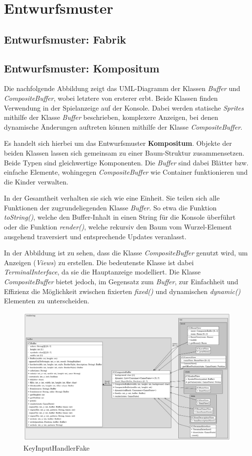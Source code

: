 \chapter{Entwurfsmuster}

\section{Entwurfsmuster: Fabrik}

\section{Entwurfsmuster: Kompositum}

Die nachfolgende Abbildung zeigt das UML-Diagramm der Klassen
\textit{Buffer} und \textit{CompositeBuffer}, wobei letztere von
ersterer erbt. Beide Klassen finden Verwendung in der Spielanzeige
auf der Konsole. Dabei werden statische \textit{Sprites} mithilfe
der Klasse \textit{Buffer} beschrieben, komplexere Anzeigen, bei denen
dynamische Änderungen auftreten können mithilfe der Klasse
\textit{CompositeBuffer}.

Es handelt sich hierbei um das Entwurfsmuster \textbf{Kompositum}. 
Objekte der beiden Klassen lassen sich gemeinsam zu einer Baum-Struktur
zusammensetzen. Beide Typen sind gleichwertige Komponenten. Die
\textit{Buffer} sind dabei Blätter bzw. einfache Elemente, wohingegen
\textit{CompositeBuffer} wie Container funktionieren und die Kinder
verwalten. 

In der Gesamtheit verhalten sie sich wie eine Einheit. Sie teilen sich
alle Funktionen der zugrundeliegenden Klasse \textit{Buffer}. So etwa
die Funktion \textit{toString()}, welche den Buffer-Inhalt in einen
String für die Konsole überführt oder die Funktion \textit{render()},
welche rekursiv den Baum vom Wurzel-Element ausgehend traversiert und
entsprechende Updates veranlasst.

In der Abbildung ist zu sehen, dass die Klasse
\textit{CompositeBuffer} genutzt wird, um Anzeigen (\textit{Views})
zu erstellen. Die bedeutenste Klasse ist dabei
\textit{TerminalInterface}, da sie die Hauptanzeige modelliert.
Die Klasse \textit{CompositeBuffer} bietet jedoch, im Gegensatz zum
\textit{Buffer}, zur Einfachheit und Effizienz die Möglichkeit
zwischen fixierten \textit{fixed()} und dynamischen \textit{dynamic()}
Elementen zu unterscheiden.

\vspace{0.5cm}
\begin{figure}[H]
    \centering
    \includegraphics[width=1\linewidth]{Bilder/Visualisierung/CompositeBuffer_structure.png}
    \caption{KeyInputHandlerFake}
\end{figure}